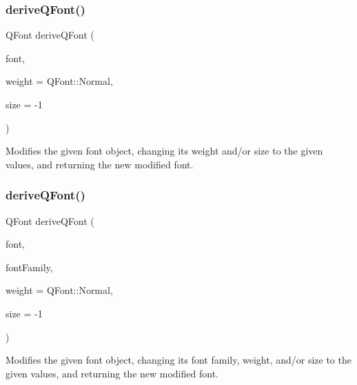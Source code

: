 \subsubsection{\texorpdfstring{derive\+Q\+Font()}{deriveQFont()}\hspace{0.1cm}{\footnotesize\ttfamily [1/4]}}
{\footnotesize\ttfamily Q\+Font derive\+Q\+Font (\begin{DoxyParamCaption}\item[{const Q\+Font \&}]{font,  }\item[{Q\+Font\+::\+Weight}]{weight = {\ttfamily QFont\+:\+:Normal},  }\item[{int}]{size = {\ttfamily -\/1} }\end{DoxyParamCaption})\hspace{0.3cm}{\ttfamily [static]}}



Modifies the given font object, changing its weight and/or size to the given values, and returning the new modified font. 

\mbox{\label{classGFont_aa0a91decdb8d9bec6e875ebac9d81c97}} 
\subsubsection{\texorpdfstring{derive\+Q\+Font()}{deriveQFont()}\hspace{0.1cm}{\footnotesize\ttfamily [2/4]}}
{\footnotesize\ttfamily Q\+Font derive\+Q\+Font (\begin{DoxyParamCaption}\item[{const Q\+Font \&}]{font,  }\item[{const std\+::string \&}]{font\+Family,  }\item[{Q\+Font\+::\+Weight}]{weight = {\ttfamily QFont\+:\+:Normal},  }\item[{int}]{size = {\ttfamily -\/1} }\end{DoxyParamCaption})\hspace{0.3cm}{\ttfamily [static]}}



Modifies the given font object, changing its font family, weight, and/or size to the given values, and returning the new modified font. 

\mbox{\label{classGFont_a6fdde28adfdce9b43b7eb4d4a47ca23b}} 
